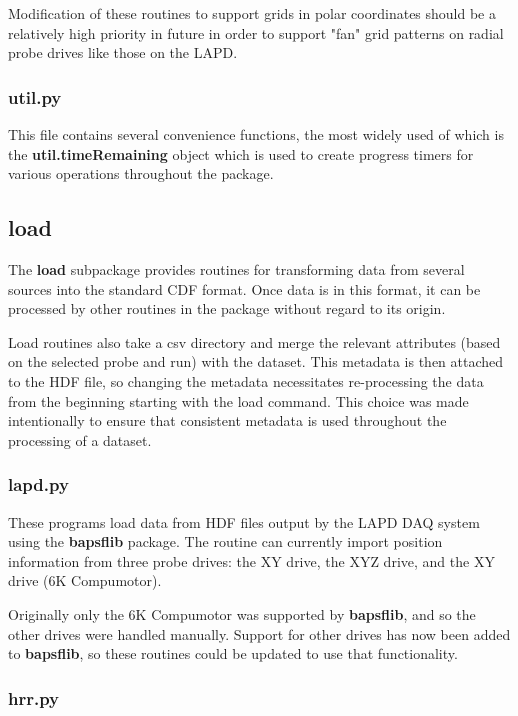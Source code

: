 \documentclass[12pt]{article}
\newcommand{\loc}[1]{{\bf \fontfamily{pcr}\selectfont #1}}
\newcommand{\todo}[1]{ \begin{tcolorbox} \centering  #1 \end{tcolorbox}}
\begin{document}
\todo{Modification of these routines to support grids in polar coordinates should be a relatively high priority in future in order to support "fan" grid patterns on radial probe drives like those on the LAPD.}


\subsubsection{\loc{util.py}}

This file contains several convenience functions, the most widely used of which is the \loc{util.timeRemaining} object which is used to create progress timers for various operations throughout the package.

\subsection{\loc{load}}

The \loc{load} subpackage provides routines for transforming data from several sources into the standard CDF format. Once data is in this format, it can be processed by other routines in the package without regard to its origin.

Load routines also take a csv directory and merge the relevant attributes (based on the selected probe and run) with the dataset. This metadata is then attached to the HDF file, so changing the metadata necessitates re-processing the data from the beginning starting with the load command. This choice was made intentionally to ensure that consistent metadata is used throughout the processing of a dataset.

\subsubsection{\loc{lapd.py}}

These programs load data from HDF files output by the LAPD DAQ system using the \loc{bapsflib} package. The routine can currently import position information from three probe drives: the XY drive, the XYZ drive, and the XY drive (6K Compumotor). 

\todo{Originally only the 6K Compumotor was supported by \loc{bapsflib}, and so the other drives were handled manually. Support for other drives has now been added to \loc{bapsflib}, so these routines could be updated to use that functionality.}

\subsubsection{\loc{hrr.py}}
\end{document}

